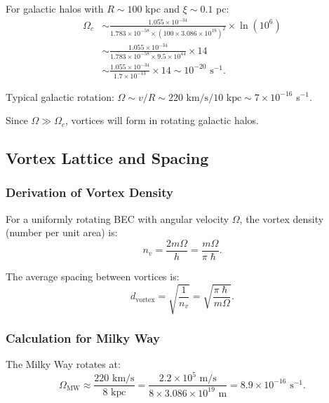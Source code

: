 \documentclass[11pt,a4paper]{article}
\newcommand{\hbar}{\ensuremath{\hslash}}
\theoremstyle{definition}
\theoremstyle{remark}
\begin{document}
For galactic halos with $R \sim 100$ kpc and $\xi \sim 0.1$ pc:
\begin{align}
\Omega_c &\sim \frac{1.055 \times 10^{-34}}{1.783 \times 10^{-58} \times (100 \times 3.086 \times 10^{19})^2} \times \ln(10^6) \\
&\sim \frac{1.055 \times 10^{-34}}{1.783 \times 10^{-58} \times 9.5 \times 10^{44}} \times 14 \\
&\sim \frac{1.055 \times 10^{-34}}{1.7 \times 10^{-13}} \times 14 \sim 10^{-20} \text{ s}^{-1}.
\end{align}

Typical galactic rotation: $\Omega \sim v/R \sim 220 \text{ km/s} / 10 \text{ kpc} \sim 7 \times 10^{-16}$ s$^{-1}$.

Since $\Omega \gg \Omega_c$, vortices will form in rotating galactic halos.

\subsection{Vortex Lattice and Spacing}
\label{sec:vortex_spacing}

\subsubsection{Derivation of Vortex Density}

For a uniformly rotating BEC with angular velocity $\Omega$, the vortex density (number per unit area) is:
\begin{equation}
n_v = \frac{2m\Omega}{h} = \frac{m\Omega}{\pi\hbar}.
\end{equation}

The average spacing between vortices is:
\begin{equation}
\label{eq:vortex_spacing}
\boxed{d_{\mathrm{vortex}} = \sqrt{\frac{1}{n_v}} = \sqrt{\frac{\pi\hbar}{m\Omega}}.}
\end{equation}

\subsubsection{Calculation for Milky Way}

The Milky Way rotates at:
\begin{equation}
\Omega_{\mathrm{MW}} \approx \frac{220 \text{ km/s}}{8 \text{ kpc}} = \frac{2.2 \times 10^5 \text{ m/s}}{8 \times 3.086 \times 10^{19} \text{ m}} = 8.9 \times 10^{-16} \text{ s}^{-1}.
\end{equation}
\end{document}
